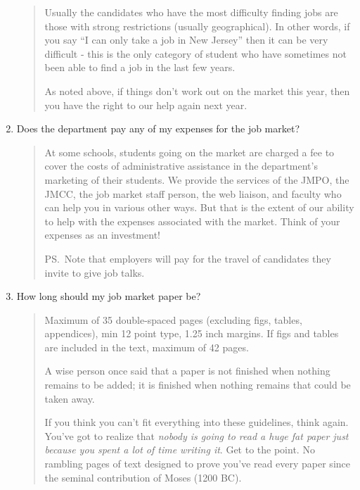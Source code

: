 \documentclass{\classes/econtex}
\begin{document}
\begin{enumerate}
\begin{quote}
    Usually the candidates who have the most difficulty finding jobs are
    those with strong restrictions (usually geographical).  In other
    words, if you say ``I can only take a job in New Jersey'' then it can
    be very difficult - this is the only category of student who 
    have sometimes not been able to find a job in the last few years.

    As noted above, if things don't work out on the market this year, then
    you have the right to our help again next year.

  \end{quote}

\item  Does the department pay any of my expenses for the job market?

  \begin{quote}  
    At some schools, students going on the market are charged a fee to cover the costs of administrative assistance in the department's marketing of their students.  We provide the services of the JMPO, the JMCC, the job market staff person, the web liaison, and faculty who can help you in various other ways.  But that is the extent of our ability to help with the expenses associated with the market.  Think of your expenses as an investment!

    PS.\ Note that employers will pay for the travel of candidates they invite to give job talks. 

  \end{quote}

\item  How long should my job market paper be?

  \begin{quote}
    Maximum of 35 double-spaced pages (excluding figs, tables,
    appendices), min 12 point type, 1.25 inch margins.  If figs and
    tables are included in the text, maximum of 42 pages.   
    
    A wise person once said that a paper is not finished when nothing
    remains to be added; it is finished when nothing remains that could
    be taken away.
    
    If you think you can't fit everything into these guidelines, think
    again.  You've got to realize that \textit{nobody is going to read a
      huge fat paper just because you spent a lot of time writing it}.
    Get to the point.  No rambling pages of text designed to prove you've
    read every paper since the seminal contribution of Moses (1200 BC).


\end{quote}
\end{enumerate}
\end{document}
